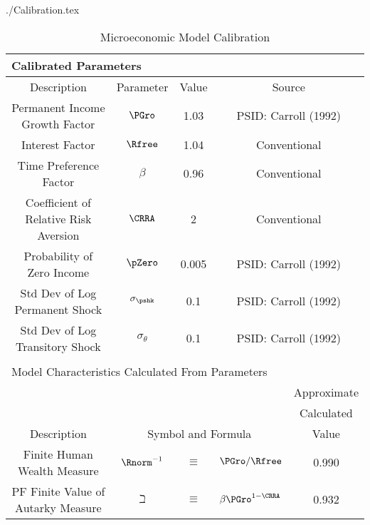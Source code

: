 \documentclass[titlepage,abstract]{bejournal}
\begin{document}
\begin{verbatimwrite}{./Calibration.tex}
\begin{table}
\begin{center}
\caption{Microeconomic Model Calibration}\label{table:Calibration}
\begin{tabular}{|c|ccl|c|}
\hline
\multicolumn{5}{|l|}{Calibrated Parameters}  \\ \hline
Description                     & \multicolumn{1}{c}{Parameter} & Value & \multicolumn{2}{c|}{Source}\\ \hline
Permanent Income Growth Factor  & \multicolumn{1}{c}{$\PGro$} & 1.03 & \multicolumn{2}{c|}{PSID: Carroll (1992)} \\
Interest Factor                 & \multicolumn{1}{c}{$\Rfree$} & 1.04 & \multicolumn{2}{c|}{Conventional} \\
Time Preference Factor          & \multicolumn{1}{c}{$\beta$} & 0.96 & \multicolumn{2}{c|}{Conventional} \\
Coefficient of Relative Risk Aversion & \multicolumn{1}{c}{$\CRRA$} & 2 & \multicolumn{2}{c|}{Conventional} \\
Probability of Zero Income      & \multicolumn{1}{c}{$\pZero$} & 0.005 & \multicolumn{2}{c|}{PSID: Carroll (1992)} \\
Std Dev of Log Permanent Shock  & \multicolumn{1}{c}{$\sigma_{\pshk}$} & 0.1 & \multicolumn{2}{c|}{PSID: Carroll (1992)} \\
Std Dev of Log Transitory Shock & \multicolumn{1}{c}{$\sigma_{\theta}$} & 0.1 & \multicolumn{2}{c|}{PSID: Carroll (1992)} \\ \hline
\multicolumn{5}{l}{}  \\ \hline
\multicolumn{5}{|l|}{Model Characteristics Calculated From Parameters}  \\ \hline
                                            & \multicolumn{3}{c|}{}                                      & Approximate \\
                                            & \multicolumn{3}{c|}{}                                       & Calculated \\
Description                                 & \multicolumn{3}{c|}{Symbol and Formula}                       & Value \\ \hline
Finite Human Wealth Measure                 & $\Rnorm^{-1}$ & $\equiv$ & $\PGro/\Rfree$                    & 0.990 \\
PF Finite Value of Autarky Measure& $\beth$ & $\equiv$ & $\beta \PGro^{1-\CRRA}$                    & 0.932 \\

\end{tabular}
\end{center}
\end{table}
\end{verbatimwrite}
\end{document}
